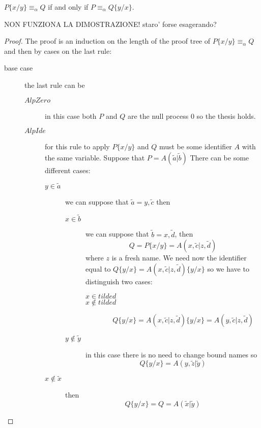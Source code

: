 \begin{lemma}
  $P\{x/y\}\equiv_{\alpha}Q$ if and only if $P\equiv_{\alpha}Q\{y/x\}$. 

  NON FUNZIONA LA DIMOSTRAZIONE! staro' forse esagerando?
  \begin{proof}
    The proof is an induction on the length of the proof tree of $P\{x/y\}\equiv_{\alpha}Q$ and then by cases on the last rule:
    \begin{description}
      \item[base case]
	the last rule can be
	\begin{description}
	  \item[$AlpZero$]
	    in this case both $P$ and $Q$ are the null process $0$ so the thesis holds.
	  \item[$AlpIde$]
 	    for this rule to apply $P\{x/y\}$ and $Q$ must be some identifier $A$ with the same variable. Suppose that 
	    $P=A(\tilde{a}|\tilde{b})$
	    There can be some different cases:
	    \begin{description}
	      \item[$y\in \tilde{a}$]
		we can suppose that $\tilde{a}=y, \tilde{c}$ then
		\begin{description}
		  \item[$x\in \tilde{b}$]
		    we can suppose that $\tilde{b}=x, \tilde{d}$, then
		    \[
		      Q=P\{x/y\}=A(x, \tilde{c}|z, \tilde{d})
		    \]
		    where $z$ is a fresh name. We need now the identifier equal to $Q\{y/x\}=A(x, \tilde{c}|z, \tilde{d})\{y/x\}$ so we have to distinguish two cases:
		    \begin{description}
		      \item[$x\in tilde{d}$]
			
		      \item[$x\notin tilde{d}$]
		      \[
			Q\{y/x\}=A(x, \tilde{c}|z, \tilde{d})\{y/x\}=A(y, \tilde{c}|z, \tilde{d})
		      \]			
		    \end{description}
		  \item[$y\notin \tilde{y}$]
		    in this case there is no need to change bound names so 
		    \[
		      Q\{y/x\}=A(y, \tilde{z}|\tilde{y})
		    \]
		\end{description}
	      \item[$x\notin \tilde{x}$]
		then 
		\[
		  Q\{y/x\}=Q=A(\tilde{x}|\tilde{y})
		\]
		  
	    \end{description}


\end{description}
\end{description}
\end{proof}
\end{lemma}
